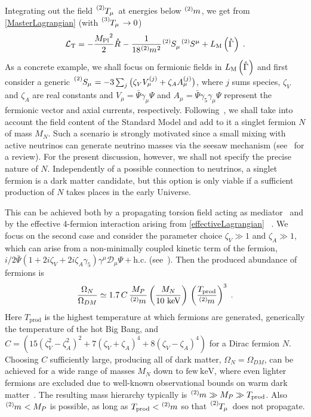 \documentclass[aps,prd,reprint,preprintnumbers,showpacs,floatfix,nofootinbib,superscript address,longbibliography]{revtex4-1}
\begin{document}
Integrating out the field $\T[2]{_{\mu}}$ at energies below $\mass[2]{}$, we get from \eq \eqref{MasterLagrangian} (with  $\T[3]{_{\mu}}\to 0$)
\begin{equation} \label{effectiveLagrangian}
	\mathcal{L}_{\text{T}} = - \frac{\Planck^2}{2}  \rR{} - \frac{1}{18 \mass[2]{}^2} \Si[2]{_{\mu}} \Si[2]{^{\mu}} + 	L_{\text{M}}\left(\rCon{}\right) \;.
\end{equation}
As a concrete example, we shall focus on fermionic fields in $L_{\text{M}}\left(\rCon{}\right)$ and first consider a generic $\Si[2]{_{\mu}} = -3 \sum_j \big(\zeta_V V^{(j)}_\mu + \zeta_A A^{(j)}_\mu\big)$, where $j$ sums species, $\zeta_V$ and $\zeta_A$ are real constants and $V_\mu = \bar{\Psi} \gamma_\mu \Psi$ and $A_\mu = \bar{\Psi} \gamma_5 \gamma_\mu \Psi$ represent the fermionic vector and axial currents, respectively. Following~\cite{Shaposhnikov:2020aen}, we shall take into account the field content of the Standard Model and add to it a singlet fermion $N$ of mass $M_N$. Such a scenario is strongly motivated since a small mixing with active neutrinos can generate neutrino masses via the seesaw mechanism (see~\cite{Boyarsky:2018tvu} for a review). For the present discussion, however, we shall not specify the precise nature of $N$. Independently of a possible connection to neutrinos, a singlet fermion is a dark matter candidate, but this option is only viable if a sufficient production of $N$ takes places in the early Universe. 

This can be achieved both by a propagating torsion field acting as mediator~\cite{Barman:2019mlj} and by the effective 4-fermion interaction arising from \eq \eqref{effectiveLagrangian} ~\cite{Shaposhnikov:2020aen}. We focus on the second case and consider the parameter choice $\zeta_V \gg 1$ and $\zeta_A \gg 1$, which can arise from a non-minimally coupled kinetic term of the fermion, $i/2 \bar{\Psi} (1+ 2 i \zeta_V + 2 i \zeta_A \gamma_5) \gamma^\mu \mathcal{D}_\mu \Psi + \text{h.c.}$ (see~\cite{Shaposhnikov:2020frq,Karananas:2021zkl,Rigouzzo:2023sbb}).  Then the produced abundance of fermions is~\cite{Shaposhnikov:2020aen}
\begin{equation}
	\frac{\Omega_N}{\Omega_{DM}}\simeq 1.7 \, C \, \frac{M_P}{\mass[2]{}} \left( \frac{M_N}{10~\text{keV}}\right) \, \left( \frac{T_\mathrm{prod}}{\mass[2]{}} \right)^3 \;.
	\label{darkMatterAbundance}
\end{equation}
Here $T_\mathrm{prod}$ is the highest temperature at which fermions are generated, \ie generically the temperature of the hot Big Bang, and $C = \left(15(\zeta_V^2 - \zeta_A^2)^2 + 7(\zeta_V + \zeta_A)^4 + 8 (\zeta_V - \zeta_A)^4\right)$ for a Dirac fermion $N$. Choosing $C$ sufficiently large, producing all of dark matter, $\Omega_N=\Omega_{DM}$, can be achieved for a wide range of masses $M_N$ down to $\text{few}~\text{keV}$, where even lighter fermions are excluded due to well-known observational bounds on warm dark matter~\cite{Garzilli:2018jqh, Garzilli:2019qki}. The resulting mass hierarchy typically is $\mass[2]{}\gg M_P \gg T_\mathrm{prod}$. Also $\mass[2]{}< M_P$ is possible, as long as $T_\mathrm{prod}<\mass[2]{}$ so that $\T[2]{_{\mu}}$ does not propagate.
\end{document}
